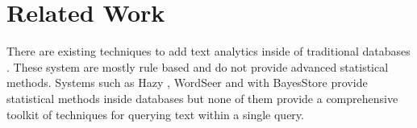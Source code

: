 
\section{Related Work}

There are existing techniques to add text analytics inside of 
traditional databases \cite{Jain:2009:BQO:1519103.1519108, Li:2011:SDI:2002440.2002459}.
These system are mostly rule based and do not provide advanced
statistical methods.
Systems such as Hazy \cite{Koc:2011:IMC:1952376.1952380}, 
WordSeer \cite{muralidharanvisual} and 
with BayesStore \cite{Wang:2008:BML:1453856.1453896} provide statistical 
methods inside databases but none of them provide a 
comprehensive toolkit of techniques for querying text within a single query.
